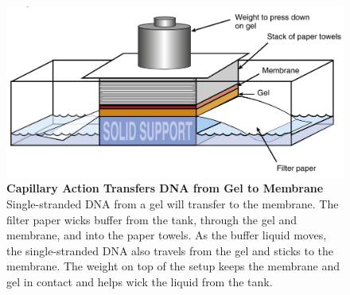 \documentclass[11pt,dvipsnames,ignorenonframetext,aspectratio=169]{beamer}
\begin{document}
\begin{frame}{}
\protect\hypertarget{section-30}{}
\begin{figure}
\includegraphics[width=0.35\linewidth]{./../images/southern_blotting} \caption{\textbf{Capillary Action Transfers DNA from Gel to Membrane} \newline Single-stranded DNA from a gel will transfer to the membrane. The filter paper wicks buffer from the tank, through the gel and membrane, and into the paper towels. As the buffer liquid moves, the single-stranded DNA also travels from the gel and sticks to the membrane. The weight on top of the setup keeps the membrane and gel in contact and helps wick the liquid from the tank.}\label{fig:southern-blotting}
\end{figure}
\end{frame}
\end{document}
